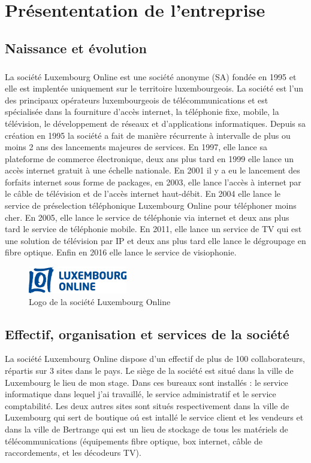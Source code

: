 \chapter{Présententation de l'entreprise}
\section{Naissance et évolution}
\paragraph*{}
La société Luxembourg Online est une société anonyme (SA) fondée en 1995 et elle est implentée uniquement sur le territoire luxembourgeois. La société est l'un des principaux opérateurs luxembourgeois de télécommunications et est spécialisée dans la fourniture d'accès internet, la téléphonie fixe, mobile, la télévision, le développement de réseaux et d'applications informatiques. Depuis sa création en 1995 la société a fait de manière récurrente à intervalle de plus ou moins 2 ans des lancements majeures de services.  En 1997, elle lance sa plateforme de commerce électronique, deux ans plus tard en 1999 elle lance un accès internet gratuit à une échelle nationale. En 2001 il y a eu le lancement des forfaits internet sous forme de packages, en 2003, elle lance l'accès à internet par le câble de télévision et de l'accès internet haut-débit. En 2004 elle lance le service de préselection téléphonique Luxembourg Online pour téléphoner moins cher. En 2005, elle lance le service de téléphonie via internet et deux ans plus tard le service de téléphonie mobile. En 2011, elle lance un service de TV qui est une solution de télévision par \gls{IP} et deux ans plus tard elle lance le dégroupage en fibre optique. Enfin en 2016 elle lance le service de visiophonie.

\begin{figure}[H]
	\centering
	\includegraphics[scale=1]{assets/images/Logo-LOL.png}
	\caption{Logo de la société Luxembourg Online}
	\label{fig.1}
\end{figure} 

\section{Effectif, organisation et services de la société}
La société Luxembourg Online dispose d'un effectif de plus de 100 collaborateurs, répartis sur 3 sites dans le pays. Le siège de la société est situé dans la ville de Luxembourg le lieu de mon stage. Dans ces bureaux sont installés : le service informatique dans lequel j'ai travaillé, le service administratif et le service comptabilité. Les deux autres sites sont situés respectivement dans la ville de Luxembourg qui sert de boutique oú est intallé le service client et les vendeurs et dans la ville de Bertrange qui est un lieu de stockage de tous les matériels de télécommunications (équipements fibre optique, box internet, câble de raccordements, et les décodeurs TV).
